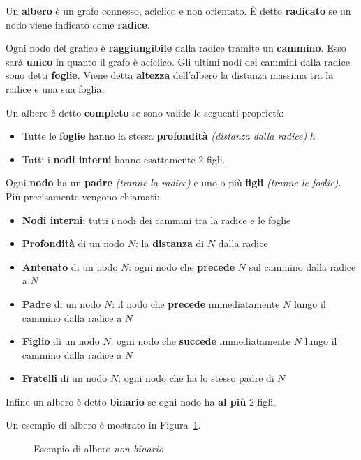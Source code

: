 \documentclass[italian, 10pt]{article}
\begin{document}
Un \textbf{albero} è un grafo connesso, aciclico e non orientato.
È detto \textbf{radicato} se un nodo viene indicato come \textbf{radice}.

Ogni nodo del grafico è \textbf{raggiungibile} dalla radice tramite un \textbf{cammino}.
Esso sarà \textbf{unico} in quanto il grafo è aciclico.
Gli ultimi nodi dei cammini dalla radice sono detti \textbf{foglie}.
Viene detta \textbf{altezza} dell'albero la distanza massima tra la radice e una sua foglia.

Un albero è detto \textbf{completo} se sono valide le seguenti proprietà:

\begin{itemize}
  \item Tutte le \textbf{foglie} hanno la stessa \textbf{profondità} \textit{(distanza dalla radice)} \(h\)
  \item Tutti i \textbf{nodi interni} hanno esattamente \(2\) figli.
\end{itemize}

\bigskip
Ogni \textbf{nodo} ha un \textbf{padre} \textit{(tranne la radice)} e uno o più \textbf{figli} \textit{(tranne le foglie)}.
Più precisamente vengono chiamati:

\begin{itemize}
  \item \textbf{Nodi interni}: tutti i nodi dei cammini tra la radice e le foglie
  \item \textbf{Profondità} di un nodo \(N\): la \textbf{distanza} di \(N\) dalla radice
  \item \textbf{Antenato} di un nodo \(N\):  ogni nodo che \textbf{precede} \(N\) sul cammino dalla radice a \(N\)
  \item \textbf{Padre} di un nodo \(N\): il nodo che \textbf{precede} immediatamente \(N\) lungo il cammino dalla radice a \(N\)
  \item \textbf{Figlio} di un nodo \(N\): ogni nodo che \textbf{succede} immediatamente \(N\) lungo il cammino dalla radice a \(N\)
  \item \textbf{Fratelli} di un nodo \(N\): ogni nodo che ha lo stesso padre di \(N\)
\end{itemize}

Infine un albero è detto \textbf{binario} se ogni nodo ha \textbf{al più} \(2\) figli.

\bigskip
Un esempio di albero è mostrato in Figura~\ref{fig:esempio-di-albero}.

\begin{figure}[htbp]
  \bigskip
  \centering
  \caption{Esempio di albero \textit{non binario}}
  \label{fig:esempio-di-albero}
  \bigskip
\end{figure}
\end{document}
